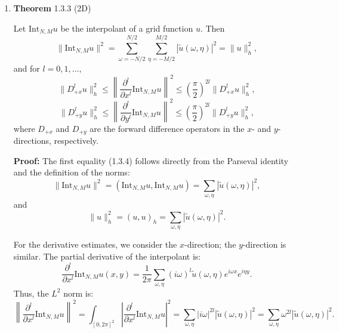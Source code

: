 \documentclass[12pt]{article}
\begin{document}
\begin{enumerate}
        \item   \textbf{Theorem} 1.3.3 (2D)

                Let $\text{Int}_{N,M} u$ be the interpolant of a grid function $u$. Then
                \begin{equation*}
                    \|\text{Int}_{N,M} u\|^2 = \sum_{\omega=-N/2}^{N/2} \sum_{\eta=-M/2}^{M/2} |\tilde{u}(\omega, \eta)|^2 = \|u\|_h^2, \tag{1.3.4}
                \end{equation*}
                and for $l = 0, 1, \ldots$,
                \begin{equation*}
                    \|D_{+x}^l u\|_h^2 \leq \left\| \frac{\partial^l}{\partial x^l} \text{Int}_{N,M} u \right\|^2 \leq \left( \frac{\pi}{2} \right)^{2l} \|D_{+x}^l u\|_h^2,
                \end{equation*}
                \begin{equation*}
                    \|D_{+y}^l u\|_h^2 \leq \left\| \frac{\partial^l}{\partial y^l} \text{Int}_{N,M} u \right\|^2 \leq \left( \frac{\pi}{2} \right)^{2l} \|D_{+y}^l u\|_h^2,
                \end{equation*}
                where $D_{+x}$ and $D_{+y}$ are the forward difference operators in the $x$- and $y$-directions, respectively.

                \textbf{Proof:}  
                The first equality (1.3.4) follows directly from the Parseval identity and the definition of the norms:
                \begin{equation*}
                    \|\text{Int}_{N,M} u\|^2 = (\text{Int}_{N,M} u, \text{Int}_{N,M} u) = \sum_{\omega,\eta} |\tilde{u}(\omega, \eta)|^2,
                \end{equation*}
                and
                \begin{equation*}
                    \|u\|_h^2 = (u, u)_h = \sum_{\omega,\eta} |\tilde{u}(\omega, \eta)|^2.
                \end{equation*}

                For the derivative estimates, we consider the $x$-direction; the $y$-direction is similar. The partial derivative of the interpolant is:
                \begin{equation*}
                    \frac{\partial^l}{\partial x^l} \text{Int}_{N,M} u(x,y) = \frac{1}{2\pi} \sum_{\omega,\eta} (i\omega)^l \tilde{u}(\omega, \eta) e^{i\omega x} e^{i\eta y}.
                \end{equation*}
                Thus, the $L^2$ norm is:
                \begin{equation*}
                    \left\| \frac{\partial^l}{\partial x^l} \text{Int}_{N,M} u \right\|^2 = \int_{[0,2\pi]^2}\left| \frac{\partial^l}{\partial x^l} \text{Int}_{N,M} u \right|^2 = \sum_{\omega,\eta} |i\omega|^{2l} |\tilde{u}(\omega, \eta)|^2 = \sum_{\omega,\eta} \omega^{2l} |\tilde{u}(\omega, \eta)|^2.
                \end{equation*}


\end{enumerate}
\end{document}
